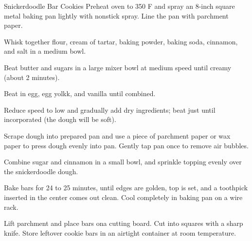 \documentclass[letterpaper]{book}
\begin{document}
\begin{recipe}{Snickerdoodle Bar Cookies}{}{}
    \newstep
    Preheat oven to 350\0 F and spray an 8-inch square metal baking pan lightly with nonstick spray.
    Line the pan with parchment paper.

    Whisk together flour, cream of tartar, baking powder, baking soda, cinnamon, and salt in a medium bowl.

    Beat butter and sugars in a large mixer bowl at medium speed until creamy (about 2 minutes).

    Beat in egg, egg yolkk, and vanilla until combined.

    \newstep
    Reduce speed to low and gradually add dry ingredients; beat just until incorporated (the dough will be soft).

    \newstep
    Scrape dough into prepared pan and use a piece of parchment paper or wax paper to press dough evenly into pan.
    Gently tap pan once to remove air bubbles.
    
    Combine sugar and cinnamon in a small bowl, and sprinkle topping evenly over the snickerdoodle dough.

    \newstep
    Bake bars for 24 to 25 minutes, until edges are golden, top is set, and a toothpick inserted in the center comes out clean. Cool completely in baking pan on a wire rack.

    Lift parchment and place bars ona cutting board.
    Cut into squares with a sharp knife.
    Store leftover cookie bars in an airtight container at room temperature.
\end{recipe}
\end{document}
